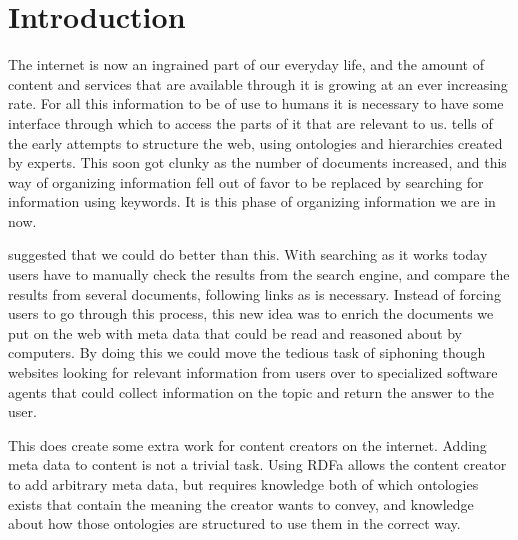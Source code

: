 
\chapter{Introduction} %

\label{Introduction}



The internet is now an ingrained part of our everyday life,
and the amount of content and services that are available through it is growing at an ever increasing rate.
For all this information to be of use to humans it is necessary to have some interface through which to access the parts of it that are relevant to us.
\citet{Shirky2007} tells of the early attempts to structure the web,
using ontologies and hierarchies created by experts.
This soon got clunky as the number of documents increased,
and this way of organizing information fell out of favor to be replaced by searching for information using keywords.
It is this phase of organizing information we are in now.

\citet{Berners-Lee2001} suggested that we could do better than this.
With searching as it works today users have to manually check the results from the search engine,
and compare the results from several documents, following links as is necessary.
Instead of forcing users to go through this process,
this new idea was to enrich the documents we put on the web with meta data that could be read and reasoned about by computers.
By doing this we could move the tedious task of siphoning though websites looking for relevant information from users
over to specialized software agents that could collect information on the topic and return the answer to the user.

This does create some extra work for content creators on the internet.
Adding meta data to content is not a trivial task.
Using RDFa allows the content creator to add arbitrary meta data,
but requires knowledge both of which ontologies exists that contain the meaning the creator wants to convey,
and knowledge about how those ontologies are structured to use them in the correct way.


